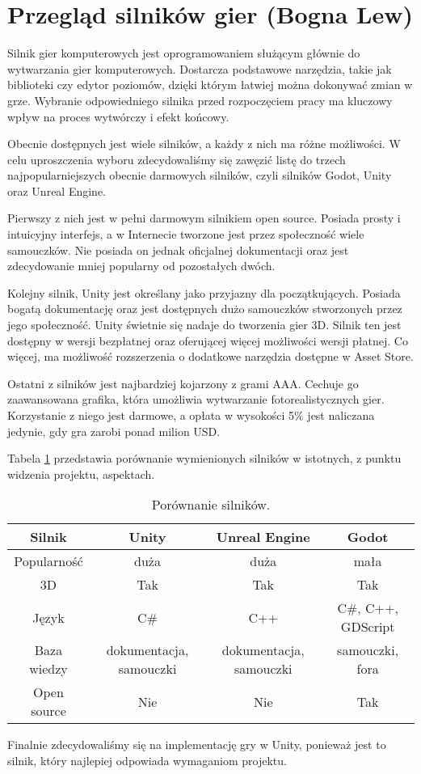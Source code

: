 \section{Przegląd silników gier (Bogna Lew)}\label{s:silniki}
Silnik gier komputerowych jest oprogramowaniem służącym głównie do wytwarzania gier komputerowych. Dostarcza podstawowe
narzędzia, takie jak biblioteki czy edytor poziomów, dzięki którym łatwiej można dokonywać zmian w grze. Wybranie
odpowiedniego silnika przed rozpoczęciem pracy ma kluczowy wpływ na proces wytwórczy i efekt końcowy.

Obecnie dostępnych jest wiele silników, a każdy z nich ma różne możliwości. W celu uproszczenia wyboru zdecydowaliśmy
się zawęzić listę do trzech najpopularniejszych obecnie darmowych silników, czyli silników Godot, Unity oraz Unreal Engine.

Pierwszy z nich jest w pełni darmowym silnikiem open source. Posiada prosty i intuicyjny interfejs, a w Internecie
tworzone jest przez społeczność wiele samouczków. Nie posiada on jednak oficjalnej dokumentacji oraz jest zdecydowanie
mniej popularny od pozostałych dwóch.

Kolejny silnik, Unity jest określany jako przyjazny dla początkujących. Posiada bogatą dokumentację oraz jest dostępnych
dużo samouczków stworzonych przez jego społeczność. Unity świetnie się nadaje do tworzenia gier 3D. Silnik ten jest
dostępny w wersji bezpłatnej oraz oferującej więcej możliwości wersji płatnej. Co więcej, ma możliwość rozszerzenia
o dodatkowe narzędzia dostępne w Asset Store.

Ostatni z silników jest najbardziej kojarzony z grami AAA. Cechuje go zaawansowana grafika, która umożliwia wytwarzanie
fotorealistycznych gier. Korzystanie z niego jest darmowe, a opłata w wysokości 5\% jest naliczana jedynie, gdy gra
zarobi ponad milion USD.

Tabela \ref{fig:teng} przedstawia porównanie wymienionych silników w istotnych, z punktu widzenia projektu, aspektach.

\begin{table}[h]
\caption{Porównanie silników.}
\begin{center}
\begin{tabular}{ |c||c|c|c| }
 \hline
 Silnik & Unity & Unreal Engine & Godot \\
 \hline \hline
 Popularność & duża & duża & mała \\
 \hline
 3D & Tak & Tak & Tak \\
 \hline
 Język & C\# & C++ & C\#, C++, GDScript \\
 \hline
 Baza wiedzy & dokumentacja, samouczki & dokumentacja, samouczki & samouczki, fora \\
 \hline
 Open source & Nie & Nie & Tak \\
 \hline
\end{tabular}
\end{center}
\label{fig:teng} 
\end{table}

Finalnie zdecydowaliśmy się na implementację gry w Unity, ponieważ jest to silnik, który najlepiej odpowiada wymaganiom projektu.
